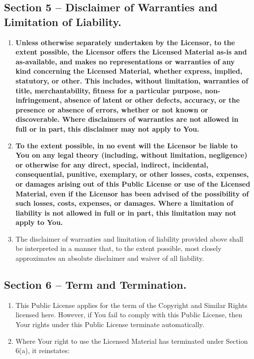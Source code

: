 \documentclass[]{book}
\begin{document}
\subsection{Section 5 -- Disclaimer of Warranties and Limitation of
Liability.}\label{section-5-disclaimer-of-warranties-and-limitation-of-liability.}

\begin{enumerate}
\def\labelenumi{\alph{enumi}.}
\item
  \textbf{Unless otherwise separately undertaken by the Licensor, to the
  extent possible, the Licensor offers the Licensed Material as-is and
  as-available, and makes no representations or warranties of any kind
  concerning the Licensed Material, whether express, implied, statutory,
  or other. This includes, without limitation, warranties of title,
  merchantability, fitness for a particular purpose, non-infringement,
  absence of latent or other defects, accuracy, or the presence or
  absence of errors, whether or not known or discoverable. Where
  disclaimers of warranties are not allowed in full or in part, this
  disclaimer may not apply to You.}
\item
  \textbf{To the extent possible, in no event will the Licensor be
  liable to You on any legal theory (including, without limitation,
  negligence) or otherwise for any direct, special, indirect,
  incidental, consequential, punitive, exemplary, or other losses,
  costs, expenses, or damages arising out of this Public License or use
  of the Licensed Material, even if the Licensor has been advised of the
  possibility of such losses, costs, expenses, or damages. Where a
  limitation of liability is not allowed in full or in part, this
  limitation may not apply to You.}
\item
  The disclaimer of warranties and limitation of liability provided
  above shall be interpreted in a manner that, to the extent possible,
  most closely approximates an absolute disclaimer and waiver of all
  liability.
\end{enumerate}

\subsection{Section 6 -- Term and
Termination.}\label{section-6-term-and-termination.}

\begin{enumerate}
\def\labelenumi{\alph{enumi}.}
\item
  This Public License applies for the term of the Copyright and Similar
  Rights licensed here. However, if You fail to comply with this Public
  License, then Your rights under this Public License terminate
  automatically.
\item
  Where Your right to use the Licensed Material has terminated under
  Section 6(a), it reinstates:
\end{enumerate}
\end{document}
